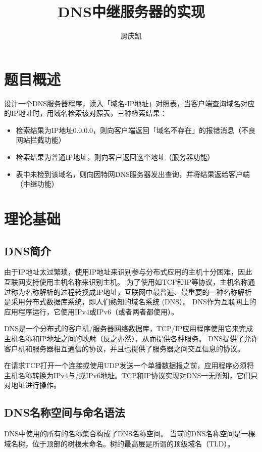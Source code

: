 \documentclass[]{article}
\title{DNS中继服务器的实现}
\author{房庆凯}
\begin{document}
\maketitle

\section{题目概述}
设计一个DNS服务器程序，读入「域名-IP地址」对照表，当客户端查询域名对应的IP地址时，用域名检索该对照表，三种检索结果：
\begin{itemize}
    \item 检索结果为IP地址0.0.0.0，则向客户端返回「域名不存在」的报错消息（不良网站拦截功能）
    \item 检索结果为普通IP地址，则向客户返回这个地址（服务器功能）
    \item 表中未检到该域名，则向因特网DNS服务器发出查询，并将结果返给客户端（中继功能）
\end{itemize}

\section{理论基础}
    \subsection{DNS简介}
        由于IP地址太过繁琐，使用IP地址来识别参与分布式应用的主机十分困难，因此互联网支持使用主机名称来识别主机。
        为了使用如TCP和IP等协议，主机名称通过称为名称解析的过程转换成IP地址，互联网中最普遍、最重要的一种名称解析是采用分布式数据库系统，即人们熟知的域名系统 (DNS）。
        DNS作为互联网上的应用程序运行，它使用IPv4或IPv6（或者两者都使用）。

        DNS是一个分布式的客户机/服务器网络数据库，TCP/IP应用程序使用它来完成主机名称和IP地址之间的映射（反之亦然），从而提供各种服务。
        DNS提供了允许客户机和服务器相互通信的协议，并且也提供了服务器之间交互信息的协议。

        在请求TCP打开一个连接或使用UDP发送一个单播数据报之前，应用程序必须将主机名称转换为IPv4与/或IPv6地址。TCP和IP协议实现对DNS一无所知，它们只对地址进行操作。


    \subsection{DNS名称空间与命名语法}
        DNS中使用的所有的名称集合构成了DNS名称空间。
        当前的DNS名称空间是一棵域名树，位于顶部的树根未命名。树的最高层是所谓的顶级域名（TLD）。
\end{document}
